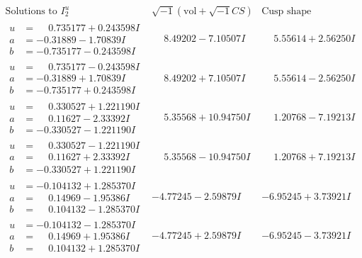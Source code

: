 \documentclass[1p]{elsarticle_modified}
\theoremstyle{definition}
\newcommand{\I}{\sqrt{-1}}
\begin{document}
$$\begin{array}{c|c|c}  
\text{Solutions to }I^u_{2}& \I (\text{vol} + \sqrt{-1}CS) & \text{Cusp shape}\\
 \hline 
\begin{aligned}
u &= \phantom{-}0.735177 + 0.243598 I \\
a &= -0.31889 - 1.70839 I \\
b &= -0.735177 - 0.243598 I\end{aligned}
 & \phantom{-}8.49202 - 7.10507 I & \phantom{-}5.55614 + 2.56250 I \\ \hline\begin{aligned}
u &= \phantom{-}0.735177 - 0.243598 I \\
a &= -0.31889 + 1.70839 I \\
b &= -0.735177 + 0.243598 I\end{aligned}
 & \phantom{-}8.49202 + 7.10507 I & \phantom{-}5.55614 - 2.56250 I \\ \hline\begin{aligned}
u &= \phantom{-}0.330527 + 1.221190 I \\
a &= \phantom{-}0.11627 - 2.33392 I \\
b &= -0.330527 - 1.221190 I\end{aligned}
 & \phantom{-}5.35568 + 10.94750 I & \phantom{-}1.20768 - 7.19213 I \\ \hline\begin{aligned}
u &= \phantom{-}0.330527 - 1.221190 I \\
a &= \phantom{-}0.11627 + 2.33392 I \\
b &= -0.330527 + 1.221190 I\end{aligned}
 & \phantom{-}5.35568 - 10.94750 I & \phantom{-}1.20768 + 7.19213 I \\ \hline\begin{aligned}
u &= -0.104132 + 1.285370 I \\
a &= \phantom{-}0.14969 - 1.95386 I \\
b &= \phantom{-}0.104132 - 1.285370 I\end{aligned}
 & -4.77245 - 2.59879 I & -6.95245 + 3.73921 I \\ \hline\begin{aligned}
u &= -0.104132 - 1.285370 I \\
a &= \phantom{-}0.14969 + 1.95386 I \\
b &= \phantom{-}0.104132 + 1.285370 I\end{aligned}
 & -4.77245 + 2.59879 I & -6.95245 - 3.73921 I \\ \hline\begin{aligned}

\end{aligned}
\end{array}$$
\end{document}
